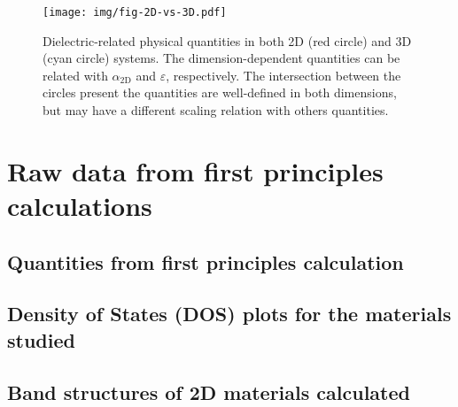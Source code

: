 \documentclass[manuscript=suppinfo,email=true,hyperref=true,keywords=false]{achemso}
\begin{document}
\begin{figure}[htbp]
\centering
\texttt{[image: img/fig-2D-vs-3D.pdf]}
\caption{\label{fig-2D-3D} Dielectric-related physical quantities in
  both 2D (red circle) and 3D (cyan circle) systems. The
  dimension-dependent quantities can be related with $\alpha_{\mathrm{2D}}$ and
  $\varepsilon$, respectively. The intersection between the circles
  present the quantities are well-defined in both dimensions, but may have a
  different scaling relation with others quantities.}
\end{figure}





\section{Raw data from first principles calculations}
\subsection{Quantities from first principles calculation}
\label{sec:raw}


\subsection{Density of States (DOS) plots for the materials studied}
\label{sec:DOS}




\subsection{Band structures of 2D materials calculated}
\label{sec:bs}




\clearpage{}
\section*{}
\label{sec:ref}

\end{document}
